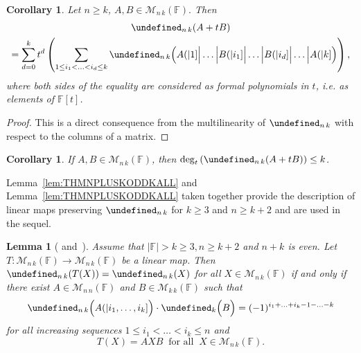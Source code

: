\documentclass{elsarticle}
\let\det\undefined
\DeclareMathOperator{\det}{det}
\def\F{{\mathbb F}}
\def\M{{\mathcal M}}
\newtheorem{lemma}[theorem]{Lemma}
\newtheorem{corollary}[theorem]{Corollary}
\newtheorem{proposition}[theorem]{Proposition}
\theoremstyle{definition}
\numberwithin{equation}{section}
\begin{document}
\begin{corollary}\label{cor:CullisBinomialExpansion}Let $n \ge k$, $A, B \in \M_{n\,k} (\F).$ %
Then
\begin{multline}\label{eq:CullisBinomialExpansion}
\det_{n\,k} (A + t B)\\
= \sum_{d = 0}^{k}t^d \left( \sum_{1 \le i_1 < \ldots < i_d \le k} \det_{n\,k}\Bigl(A(|1]\Big|\ldots \Big| B(|i_1] \Big| \ldots \Big| B(|i_d] \Big| \ldots \Big| A(|k] \Bigr)\right),
\end{multline}
where both sides of the equality are considered as formal polynomials in $t$, i.e. as elements of $\F[t]$.
\end{corollary}
\begin{proof}This is a direct consequence from the multilinearity of $\det_{n\,k}$ with respect to the columns of a matrix.
\end{proof}

\begin{corollary}\label{cor:DegDetABLEQK}If $A, B \in \M_{n\,k}(\F)$, then $\deg_t\left(\det_{n\,k} (A + t B)\right) \le k$.
\end{corollary}

%
Lemma~\ref{lem:THMNPLUSKODDKALL} and Lemma~\ref{lem:THMNPLUSKODDKALL} taken together provide the description of linear maps preserving $\det_{n\,k}$ for $k \ge 3$ and $n \ge k + 2$ and are used in the sequel.

\begin{lemma}[{\cite[Theorem~5.14]{Guterman2025} and~\cite[Theorem~5.5]{Guterman2025c}}]\label{thm:THMNPLUSKEVEN}\label{lem:THMNPLUSKEVENKALL}
Assume that $|\F| > k \ge 3, n \ge k + 2$ and  $n + k$ is even. Let $T\colon \M_{n\, k} (\F) \to \M_{n\, k} (\F)$ be a linear map. Then $\det_{n\, k} (T(X)) = \det_{n\,k}(X)$ for all $X \in \M_{n\, k} (\F)$ if and only if there exist $A \in \M_{n\, n}(\F)$ and $B \in \M_{k\, k}(\F)$ such that
\begin{equation}\label{thm:MainTheoremEvenKGe4:eq}
\det_{n\, k} \Bigl(A(|i_1,\ldots, i_k]\Bigr) \cdot \det_k \Bigl(B\Bigr) = (-1)^{i_1 + \ldots + i_k - 1 - \ldots - k}
\end{equation}
for all increasing sequences $1 \le i_1 < \ldots < i_k \le n $ and
\[
T(X) = AXB\;\;\mbox{for all}\;\; X \in \M_{n\, k} (\F).
\]
\end{lemma}
\end{document}
